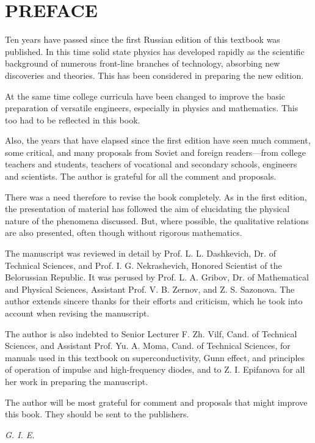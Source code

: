 

\chapter*{PREFACE}

\vspace*{-12pt}

Ten years have passed since the first Russian edition of this textbook was published. In this time solid state physics has developed rapidly as the scientific background of numerous front-line branches of technology, absorbing new discoveries and theories. This has been considered in preparing the new edition.

At the same time college curricula have been changed to improve the basic preparation of versatile engineers, especially in physics and mathematics. This too had to be reflected in this book.

Also, the years that have elapsed since the first edition have seen much comment, some critical, and many proposals from Soviet and foreign readers---from college teachers and students, teachers of vocational and secondary schools, engineers and scientists. The author is grateful for all the comment and proposals.

There was a need therefore to revise the book completely. As in the first edition, the presentation of material has followed the aim of elucidating the physical nature of the phenomena discussed. But, where possible, the qualitative relations are also presented, often though without rigorous mathematics.

The manuscript was reviewed in detail by Prof. L. L. Dashkevich, Dr. of Technical Sciences, and Prof. I. G. Nekrashevich, Honored Scientist of the Belorussian Republic. It was perused by Prof. L. A. Gribov, Dr. of Mathematical and Physical Sciences, Assistant Prof. V. B. Zernov, and Z. S. Sazonova. The author extends sincere thanks for their efforts and criticism, which he took into account when revising the manuscript.

The author is also indebted to Senior Lecturer F. Zh. Vilf, Cand. of Technical Sciences, and Assistant Prof. Yu. A. Moma, Cand. of Technical Sciences, for manuals used in this textbook on superconductivity, Gunn effect, and principles of operation of impulse and high-frequency diodes, and to Z. I. Epifanova for all her work in preparing the manuscript.

The author will be most grateful for comment and proposals that might improve this book. They should be sent to the publishers.

\begin{flushright}
	\emph{G. I. E.}
\end{flushright}

